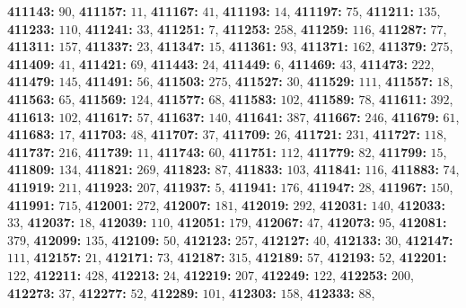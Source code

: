 \textsf{\bfseries 411143:} $90$, \textsf{\bfseries 411157:} $11$, \textsf{\bfseries 411167:} $41$, \textsf{\bfseries 411193:} $14$, \textsf{\bfseries 411197:} $75$, \textsf{\bfseries 411211:} $135$, \textsf{\bfseries 411233:} $110$, \textsf{\bfseries 411241:} $33$, \textsf{\bfseries 411251:} $7$, \textsf{\bfseries 411253:} $258$, \textsf{\bfseries 411259:} $116$, \textsf{\bfseries 411287:} $77$, \textsf{\bfseries 411311:} $157$, \textsf{\bfseries 411337:} $23$, \textsf{\bfseries 411347:} $15$, \textsf{\bfseries 411361:} $93$, \textsf{\bfseries 411371:} $162$, \textsf{\bfseries 411379:} $275$, \textsf{\bfseries 411409:} $41$, \textsf{\bfseries 411421:} $69$, \textsf{\bfseries 411443:} $24$, \textsf{\bfseries 411449:} $6$, \textsf{\bfseries 411469:} $43$, \textsf{\bfseries 411473:} $222$, \textsf{\bfseries 411479:} $145$, \textsf{\bfseries 411491:} $56$, \textsf{\bfseries 411503:} $275$, \textsf{\bfseries 411527:} $30$, \textsf{\bfseries 411529:} $111$, \textsf{\bfseries 411557:} $18$, \textsf{\bfseries 411563:} $65$, \textsf{\bfseries 411569:} $124$, \textsf{\bfseries 411577:} $68$, \textsf{\bfseries 411583:} $102$, \textsf{\bfseries 411589:} $78$, \textsf{\bfseries 411611:} $392$, \textsf{\bfseries 411613:} $102$, \textsf{\bfseries 411617:} $57$, \textsf{\bfseries 411637:} $140$, \textsf{\bfseries 411641:} $387$, \textsf{\bfseries 411667:} $246$, \textsf{\bfseries 411679:} $61$, \textsf{\bfseries 411683:} $17$, \textsf{\bfseries 411703:} $48$, \textsf{\bfseries 411707:} $37$, \textsf{\bfseries 411709:} $26$, \textsf{\bfseries 411721:} $231$, \textsf{\bfseries 411727:} $118$, \textsf{\bfseries 411737:} $216$, \textsf{\bfseries 411739:} $11$, \textsf{\bfseries 411743:} $60$, \textsf{\bfseries 411751:} $112$, \textsf{\bfseries 411779:} $82$, \textsf{\bfseries 411799:} $15$, \textsf{\bfseries 411809:} $134$, \textsf{\bfseries 411821:} $269$, \textsf{\bfseries 411823:} $87$, \textsf{\bfseries 411833:} $103$, \textsf{\bfseries 411841:} $116$, \textsf{\bfseries 411883:} $74$, \textsf{\bfseries 411919:} $211$, \textsf{\bfseries 411923:} $207$, \textsf{\bfseries 411937:} $5$, \textsf{\bfseries 411941:} $176$, \textsf{\bfseries 411947:} $28$, \textsf{\bfseries 411967:} $150$, \textsf{\bfseries 411991:} $715$, \textsf{\bfseries 412001:} $272$, \textsf{\bfseries 412007:} $181$, \textsf{\bfseries 412019:} $292$, \textsf{\bfseries 412031:} $140$, \textsf{\bfseries 412033:} $33$, \textsf{\bfseries 412037:} $18$, \textsf{\bfseries 412039:} $110$, \textsf{\bfseries 412051:} $179$, \textsf{\bfseries 412067:} $47$, \textsf{\bfseries 412073:} $95$, \textsf{\bfseries 412081:} $379$, \textsf{\bfseries 412099:} $135$, \textsf{\bfseries 412109:} $50$, \textsf{\bfseries 412123:} $257$, \textsf{\bfseries 412127:} $40$, \textsf{\bfseries 412133:} $30$, \textsf{\bfseries 412147:} $111$, \textsf{\bfseries 412157:} $21$, \textsf{\bfseries 412171:} $73$, \textsf{\bfseries 412187:} $315$, \textsf{\bfseries 412189:} $57$, \textsf{\bfseries 412193:} $52$, \textsf{\bfseries 412201:} $122$, \textsf{\bfseries 412211:} $428$, \textsf{\bfseries 412213:} $24$, \textsf{\bfseries 412219:} $207$, \textsf{\bfseries 412249:} $122$, \textsf{\bfseries 412253:} $200$, \textsf{\bfseries 412273:} $37$, \textsf{\bfseries 412277:} $52$, \textsf{\bfseries 412289:} $101$, \textsf{\bfseries 412303:} $158$, \textsf{\bfseries 412333:} $88$, 
